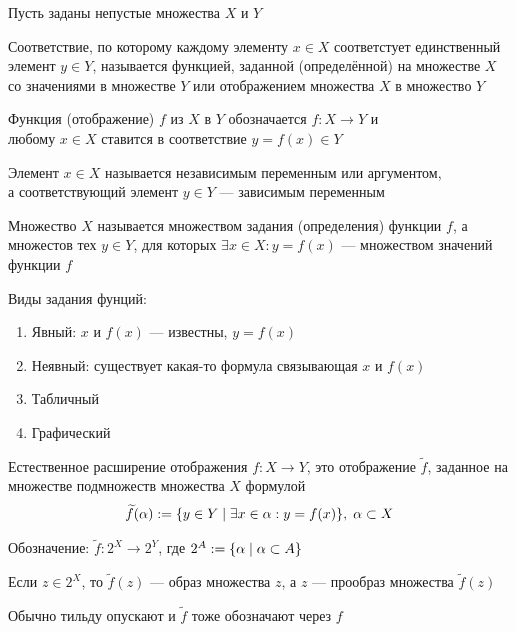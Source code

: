 \documentclass{article}
\begin{document}


Пусть заданы непустые множества $X$ и $Y$

Соответствие, по которому каждому элементу $x \in X$ соответстует единственный элемент $y \in Y$, называется функцией,
заданной (определённой) на множестве $X$ со значениями в множестве $Y$ или отображением множества $X$ в множество $Y$

Функция (отображение) $f$ из $X$ в $Y$ обозначается $f:X\to Y$ и\\
любому $x\in X$ ставится в соответствие $y=f(x)\in Y$

Элемент $x\in X$ называется независимым переменным или аргументом,\\
а соответствующий элемент $y \in Y$ --- зависимым переменным

Множество $X$ называется множеством задания (определения) функции $f$, а множестов тех $y \in Y$, для которых $\exists x\in X:y=f(x)$ --- множеством значений функции $f$

Виды задания фунций:
\begin{enumerate}
	\item{}Явный: $x$ и $f(x)$ --- известны, $y=f(x)$
	\item{}Неявный: существует какая-то формула связывающая $x$ и $f(x)$
	\item{}Табличный
	\item{}Графический
\end{enumerate}


Естественное расширение отображения $f: X\to Y$, это отображение $\widetilde{f}$, заданное на множестве подмножеств множества $X$ формулой
\begin{align*}
	\widetilde{f}(\alpha):=\{y\in Y\;|\;\exists x\in \alpha:y=f(x)\},\;\alpha \subset X
\end{align*}

Обозначение: $\widetilde{f}: 2^X \to 2^Y$, где $2^{A}:=\{\alpha\;|\;\alpha\subset A\}$

Если $z \in 2^X$, то $\widetilde{f}(z)$ --- образ множества $z$, а $z$ --- прообраз множества $\widetilde{f}(z)$

Обычно тильду опускают и $\widetilde{f}$ тоже обозначают через $f$

\end{document}
